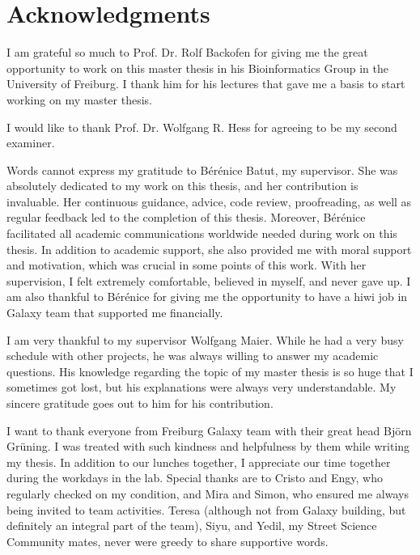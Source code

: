 %
\section*{Acknowledgments}

I am grateful so much to Prof. Dr. Rolf Backofen for giving me the great opportunity to work on this master thesis in his Bioinformatics Group in the University of Freiburg. I thank him for his lectures that gave me a basis to start working on my master thesis.

I would like to thank Prof. Dr. Wolfgang R. Hess for agreeing to be my second examiner.

Words cannot express my gratitude to Bérénice Batut, my supervisor. She was absolutely dedicated to my work on this thesis, and her contribution is invaluable. Her continuous guidance, advice, code review, proofreading, as well as regular feedback led to the completion of this thesis. Moreover, Bérénice facilitated all academic communications worldwide needed during work on this thesis. In addition to academic support, she also provided me with moral support and motivation, which was crucial in some points of this work. With her supervision, I felt extremely comfortable, believed in myself, and never gave up. I am also thankful to Bérénice for giving me the opportunity to have a hiwi job in Galaxy team that supported me financially.

I am very thankful to my supervisor Wolfgang Maier. While he had a very busy schedule with other projects, he was always willing to answer my academic questions. His knowledge regarding the topic of my master thesis is so huge that I sometimes got lost, but his explanations were always very understandable. My sincere gratitude goes out to him for his contribution.

I want to thank everyone from Freiburg Galaxy team with their great head Björn Grüning. I was treated with such kindness and helpfulness by them while writing my thesis. In addition to our lunches together, I appreciate our time together during the workdays in the lab. Special thanks are to Cristo and Engy, who regularly checked on my condition, and Mira and Simon, who ensured me always being invited to team activities. Teresa (although not from Galaxy building, but definitely an integral part of the team), Siyu, and Yedil, my Street Science Community mates, never were greedy to share supportive words.

